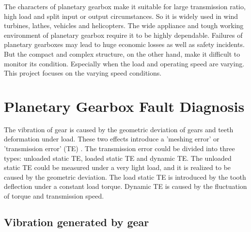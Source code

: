 The characters of planetary gearbox make it suitable for large transmission ratio, high load and split input or output circumstances. So it is widely used in wind turbines, lathes, vehicles and helicopters. The wide appliance and tough working environment of planetary gearbox require it to be highly dependable. Failures of planetary gearboxes may lead to huge economic losses as well as safety incidents. But the compact and complex structure, on the other hand, make it difficult to monitor its condition. Especially when the load and operating speed are varying. This project focuses on the varying speed conditions.


\section{Planetary Gearbox Fault Diagnosis}

The vibration of gear is caused by the geometric deviation of gears and teeth deformation under load. These two effects introduce a 'meshing error' or 'transmission error' (TE) \cite{vbcm}. The transmission error could be divided into three types: unloaded static TE, loaded static TE and dynamic TE. The unloaded static TE could be measured under a very light load, and it is realized to be caused by the geometric deviation. The load static TE is introduced by the tooth deflection under a constant load torque. Dynamic TE is caused by the fluctuation of torque and transmission speed.


\subsection{Vibration generated by gear}

